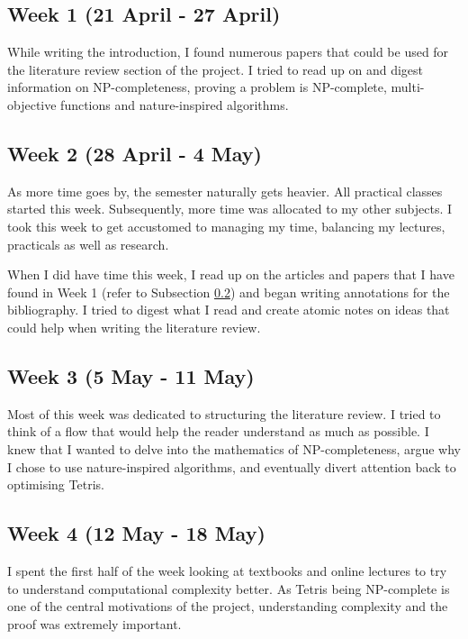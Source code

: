 \documentclass[a4paper, 12pt]{extreport}
\begin{document}
			\subsection{Week 1 (21 April - 27 April)}
				
				While writing the introduction, I found numerous papers that could be used for the literature review section of the project. I tried to read up on and digest information on NP-completeness, proving a problem is NP-complete, multi-objective functions and nature-inspired algorithms.
				
			\subsection{Week 2 (28 April - 4 May)}\label{subsec:litrevw2}
				
				As more time goes by, the semester naturally gets heavier. All practical classes started this week. Subsequently, more time was allocated to my other subjects. I took this week to get accustomed to managing my time, balancing my lectures, practicals as well as research.
				
				When I did have time this week, I read up on the articles and papers that I have found in Week 1 (refer to Subsection \ref{subsec:litrevw2}) and began writing annotations for the bibliography. I tried to digest what I read and create atomic notes on ideas that could help when writing the literature review.
				
			\subsection{Week 3 (5 May - 11 May)}\label{subsec:litrevw3}
			
				Most of this week was dedicated to structuring the literature review. I tried to think of a flow that would help the reader understand as much as possible. I knew that I wanted to delve into the mathematics of NP-completeness, argue why I chose to use nature-inspired algorithms, and eventually divert attention back to optimising Tetris.
				
			\subsection{Week 4 (12 May - 18 May)}
				
				I spent the first half of the week looking at textbooks and online lectures to try to understand computational complexity better. As Tetris being NP-complete is one of the central motivations of the project, understanding complexity and the proof was extremely important.
				
\end{document}
